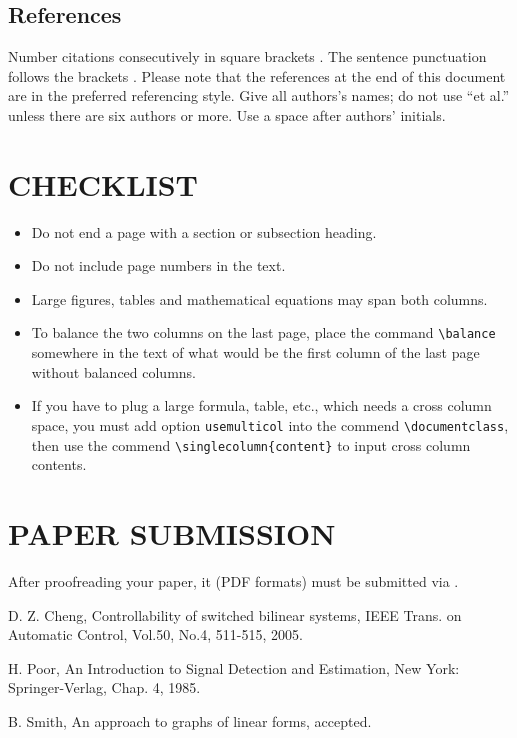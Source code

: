 \documentclass[english]{ccdconf}
\begin{document}
\subsection{References}

Number citations consecutively in square brackets \cite{bib1}. The
sentence punctuation follows the brackets \cite{bib3}. Please note
that the references at the end of this document are in the preferred
referencing style. Give all authors's names; do not use ``et al.''
unless there are six authors or more. Use a space after authors'
initials.

%
%
\balance

\section{CHECKLIST}

\begin{itemize}
  \item Do not end a page with a section or subsection heading.
  \item Do not include page numbers in the text.
  \item Large figures, tables and mathematical equations may span both columns.
  \item To balance the two columns on the last page, place the command
    \verb|\balance| somewhere in the text of what would be the first
    column of the last page without balanced columns.
  \item If you have to plug a large formula, table, etc.,  which needs a cross
  column space, you must add option \verb|usemulticol| into the
  commend \verb|\documentclass|, then use the commend
  \verb|\singlecolumn{content}| to input cross column contents.


\end{itemize}

\section{PAPER SUBMISSION}

After proofreading your paper, it (PDF formats) must be submitted
via .


\begin{thebibliography}{0}

D. Z. Cheng, Controllability of switched  bilinear systems, IEEE
Trans. on Automatic Control, Vol.50, No.4, 511-515, 2005.

 H. Poor, An Introduction to Signal Detection and
Estimation,   New York: Springer-Verlag, Chap. 4, 1985.

 B. Smith, An approach to graphs of linear forms, accepted.

\end{thebibliography}
\end{document}

